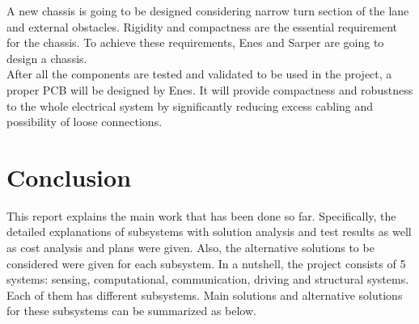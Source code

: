 \documentclass[a4paper,12pt]{article}
\begin{document}
	A new chassis is going to be designed considering narrow turn section of the lane and  external obstacles. Rigidity and compactness are  the essential requirement for the chassis. To achieve these requirements, Enes and Sarper are going to design a chassis.\\
	
	After all the components are tested and validated to be used in the project, a proper PCB will be designed by Enes. It will provide compactness and robustness to the whole electrical system by significantly reducing excess cabling and possibility of loose connections.
	
	\section{Conclusion}
	This report explains the main work that has been done so far.  Specifically, the detailed explanations of subsystems with solution analysis and test results as well as cost analysis and plans were given. Also, the alternative solutions to be considered were given for each subsystem. In a nutshell, the project consists of 5 systems: sensing, computational, communication, driving and structural systems. Each of them has different subsystems. Main solutions and alternative solutions for these subsystems can be summarized as below.
	
\end{document}
